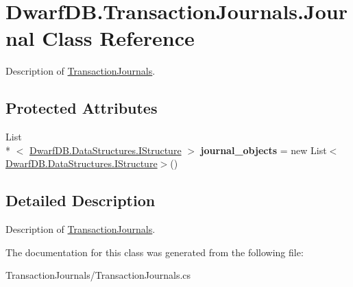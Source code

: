 \hypertarget{class_dwarf_d_b_1_1_transaction_journals_1_1_journal}{\section{Dwarf\+D\+B.\+Transaction\+Journals.\+Journal Class Reference}
\label{class_dwarf_d_b_1_1_transaction_journals_1_1_journal}
}


Description of \hyperlink{namespace_dwarf_d_b_1_1_transaction_journals}{Transaction\+Journals}.  


\subsection*{Protected Attributes}
\begin{DoxyCompactItemize}
\item 
\hypertarget{class_dwarf_d_b_1_1_transaction_journals_1_1_journal_a804e9cfa2c0d03cc2b4ec5ffc1b25bf6}{List\\*
$<$ \hyperlink{interface_dwarf_d_b_1_1_data_structures_1_1_i_structure}{Dwarf\+D\+B.\+Data\+Structures.\+I\+Structure} $>$ {\bfseries journal\+\_\+objects} = new List$<$\hyperlink{interface_dwarf_d_b_1_1_data_structures_1_1_i_structure}{Dwarf\+D\+B.\+Data\+Structures.\+I\+Structure}$>$()}\label{class_dwarf_d_b_1_1_transaction_journals_1_1_journal_a804e9cfa2c0d03cc2b4ec5ffc1b25bf6}

\end{DoxyCompactItemize}


\subsection{Detailed Description}
Description of \hyperlink{namespace_dwarf_d_b_1_1_transaction_journals}{Transaction\+Journals}. 



The documentation for this class was generated from the following file\+:\begin{DoxyCompactItemize}
\item 
Transaction\+Journals/Transaction\+Journals.\+cs\end{DoxyCompactItemize}

